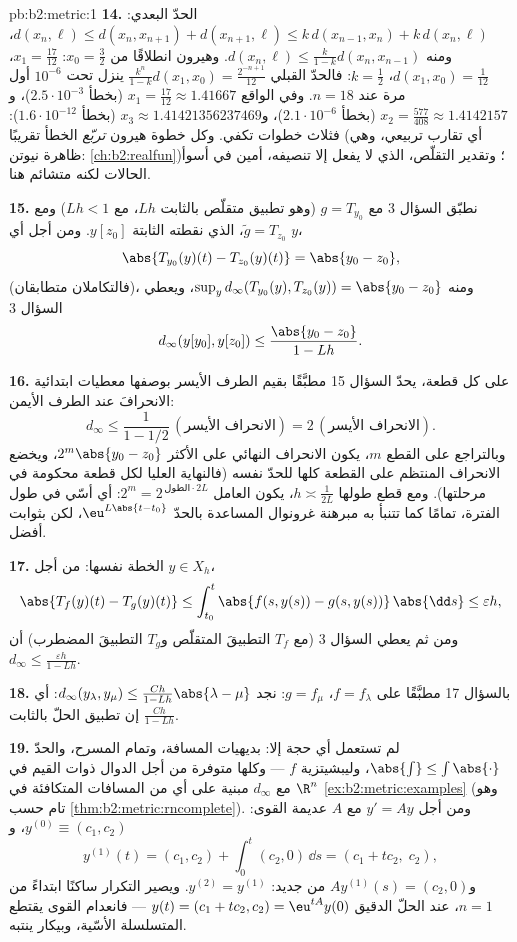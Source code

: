 \begin{solution}{pb:b2:metric:1}
\textbf{14.} الحدّ البعدي: $d(x_n, \ell) \leq d(x_n, x_{n+1}) +
d(x_{n+1}, \ell) \leq k\,d(x_{n-1}, x_n) + k\,d(x_n, \ell)$،
ومنه $d(x_n, \ell) \leq \frac{k}{1-k}d(x_n, x_{n-1})$. وهيرون
انطلاقًا من $x_0 = \frac32$: $x_1 = \frac{17}{12}$، $d(x_1, x_0) =
\frac1{12}$، $k = \frac12$: فالحدّ القبلي
$\frac{k^n}{1-k}d(x_1,x_0) = \frac{2^{-n+1}}{12}$ ينزل تحت
$10^{-6}$ أول مرة عند $n = 18$. وفي الواقع $x_1 = \frac{17}{12}
\approx 1.41667$ (بخطأ $2.5\cdot10^{-3}$)، و$x_2 =
\frac{577}{408} \approx 1.4142157$ (بخطأ $2.1\cdot10^{-6}$)،
و$x_3 \approx 1.41421356237469$ (بخطأ $1.6\cdot10^{-12}$):
فثلاث خطوات تكفي. وكل خطوة هيرون \emph{تربّع} الخطأ تقريبًا
(أي تقارب تربيعي، وهي ظاهرة نيوتن:
\cref{ch:b2:realfun})؛ وتقدير التقلّص، الذي لا يفعل
إلا تنصيفه، أمين في أسوأ الحالات لكنه متشائم هنا.

\textbf{15.} نطبّق السؤال 3 مع $g = T_{y_0}$ (وهو
تطبيق متقلّص بالثابت $Lh$، مع $Lh < 1$) ومع $\widetilde g = T_{z_0}$، الذي
نقطته الثابتة $y[z_0]$. ومن أجل أي $y$،
\[
\abs{T_{y_0}(y)(t) - T_{z_0}(y)(t)} = \abs{y_0 - z_0},
\]
(فالتكاملان متطابقان)، ومنه $\sup_y
d_\infty(T_{y_0}(y), T_{z_0}(y)) = \abs{y_0 - z_0}$، ويعطي
السؤال 3
\[
d_\infty(y[y_0], y[z_0]) \leq \frac{\abs{y_0 - z_0}}{1 - Lh} .
\]

\textbf{16.} على كل قطعة، يحدّ السؤال 15 مطبَّقًا بقيم
الطرف الأيسر بوصفها معطيات ابتدائية الانحرافَ عند
الطرف الأيمن:
\[
d_\infty \leq \frac{1}{1 - 1/2}\,(\text{الانحراف الأيسر})
= 2\,(\text{الانحراف الأيسر}) .
\] وبالتراجع
على القطع $m$، يكون الانحراف النهائي على الأكثر
$2^m\abs{y_0 - z_0}$، ويخضع الانحراف المنتظم على القطعة
كلها للحدّ نفسه (فالنهاية العليا لكل قطعة محكومة في
مرحلتها). ومع قطع طولها $h \asymp \frac1{2L}$، يكون
العامل $2^m = 2^{\,\text{الطول}\cdot 2L}$: أي أسّي في
طول الفترة، تمامًا كما تتنبأ به مبرهنة غرونوال المساعدة
بالحدّ $\eu^{L\abs{t-t_0}}$، لكن بثوابت أفضل.

\textbf{17.} الخطة نفسها: من أجل $y \in X_h$،
\[
\abs{T_f(y)(t) - T_g(y)(t)} \leq \int_{t_0}^t \abs{f(s,y(s)) -
g(s,y(s))}\,\abs{\dd s} \leq \varepsilon h ,
\]
ومن ثم يعطي السؤال 3 (مع $T_f$ التطبيقَ المتقلّص و$T_g$ التطبيقَ
المضطرب) أن $d_\infty \leq \frac{\varepsilon h}{1 - Lh}$.

\textbf{18.} بالسؤال 17 مطبَّقًا على $f = f_\lambda$، $g =
f_\mu$: نجد $d_\infty(y_\lambda, y_\mu) \leq \frac{Ch}{1 -
Lh}\abs{\lambda - \mu}$: أي إن تطبيق الحلّ  بالثابت
$\frac{Ch}{1-Lh}$.

\textbf{19.} لم تستعمل أي حجة إلا: بديهيات المسافة، وتمام
المسرح، والحدّ $\abs{\int} \leq
\int\abs{\cdot}$، وليبشيتزية $f$ --- وكلها
متوفرة من أجل الدوال ذوات القيم في $\R^n$ مع $d_\infty$ مبنية على
أي من المسافات المتكافئة في \cref{ex:b2:metric:examples}
(وهو تام حسب \cref{thm:b2:metric:rncomplete}). ومن أجل $y' = Ay$
مع $A$ عديمة القوى: $y^{(0)} \equiv (c_1, c_2)$، و
\[
y^{(1)}(t) = (c_1, c_2) + \int_0^t (c_2, 0)\,\dd s
= (c_1 + tc_2,\; c_2),
\]
و$Ay^{(1)}(s) = (c_2, 0)$ من جديد: $y^{(2)} = y^{(1)}$. ويصير
التكرار ساكنًا ابتداءً من $n = 1$، عند الحلّ الدقيق
$y(t) = (c_1 + tc_2, c_2) = \eu^{tA}y(0)$ --- فانعدام القوى
يقتطع المتسلسلة الأسّية، وبيكار ينتبه.


\end{solution}
